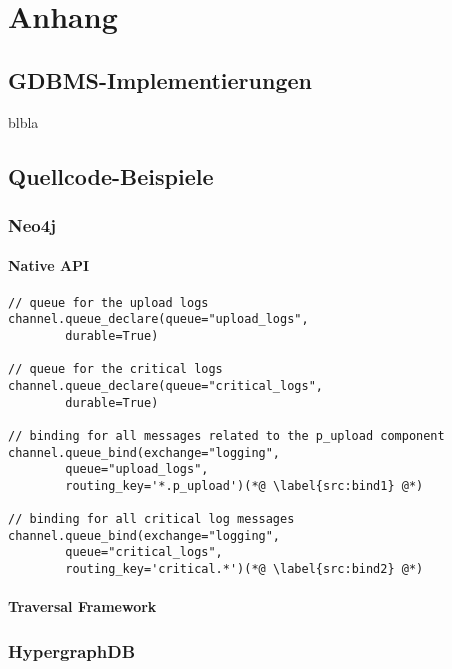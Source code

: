 \chapter{Anhang }
\label{cha:Anhang}

\section{GDBMS-Implementierungen}
\label{anh:vendor_list}

blbla

\section{Quellcode-Beispiele}

\subsection{Neo4j}

\subsubsection{Native API}
\label{anh:neo4j_native_api}

\begin{lstlisting}
// queue for the upload logs
channel.queue_declare(queue="upload_logs",
        durable=True)

// queue for the critical logs
channel.queue_declare(queue="critical_logs",
        durable=True)
 
// binding for all messages related to the p_upload component
channel.queue_bind(exchange="logging",
        queue="upload_logs",
        routing_key='*.p_upload')(*@ \label{src:bind1} @*)

// binding for all critical log messages
channel.queue_bind(exchange="logging",
        queue="critical_logs",
        routing_key='critical.*')(*@ \label{src:bind2} @*)
\end{lstlisting}

\subsubsection{Traversal Framework}
\label{anh:neo4j_traversal_framework}

\subsection{HypergraphDB}


